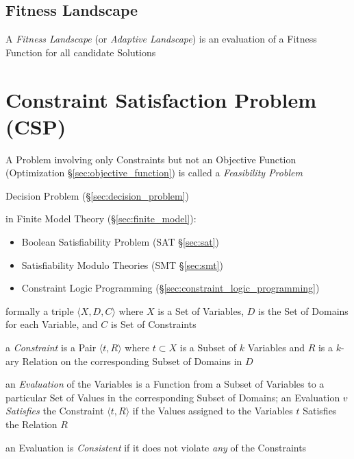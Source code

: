 \subsection{Fitness Landscape}\label{sec:fitness_landscape}

A \emph{Fitness Landscape} (or \emph{Adaptive Landscape}) is an
evaluation of a Fitness Function for all candidate Solutions %



\section{Constraint Satisfaction Problem (CSP)}
\label{sec:constraint_satisfaction}

A Problem involving only Constraints but not an Objective Function
(Optimization \S\ref{sec:objective_function}) is called a \emph{Feasibility
  Problem}

\fist Decision Problem (\S\ref{sec:decision_problem})

in Finite Model Theory (\S\ref{sec:finite_model}):
\begin{itemize}
  \item Boolean Satisfiability Problem (SAT \S\ref{sec:sat})
  \item Satisfiability Modulo Theories (SMT \S\ref{sec:smt})
  \item Constraint Logic Programming (\S\ref{sec:constraint_logic_programming})
\end{itemize}


formally a triple $\langle{X,D,C}\rangle$ where $X$ is a Set of Variables, $D$
is the Set of Domains for each Variable, and $C$ is Set of Constraints

a \emph{Constraint} is a Pair $\langle{t,R}\rangle$ where $t \subset X$ is a
Subset of $k$ Variables and $R$ is a $k$-ary Relation on the corresponding
Subset of Domains in $D$

an \emph{Evaluation} of the Variables is a Function from a Subset of Variables
to a particular Set of Values in the corresponding Subset of Domains; an
Evaluation $v$ \emph{Satisfies} the Constraint $\langle{t,R}\rangle$ if the
Values assigned to the Variables $t$ Satisfies the Relation $R$

an Evaluation is \emph{Consistent} if it does not violate \emph{any} of the
Constraints

